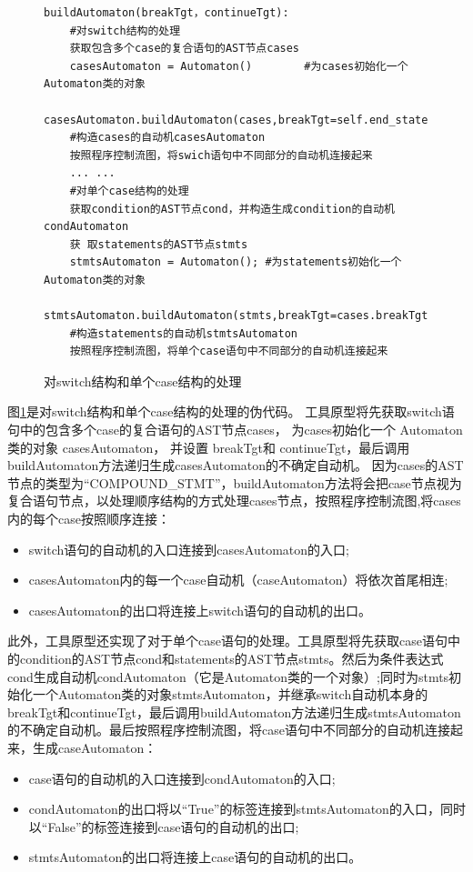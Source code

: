  \begin{figure}[htbp]
	\centering
\begin{minipage}{16cm}
\begin{lstlisting}
buildAutomaton(breakTgt，continueTgt): 
    #对switch结构的处理
    获取包含多个case的复合语句的AST节点cases
    casesAutomaton = Automaton()        #为cases初始化一个Automaton类的对象
    casesAutomaton.buildAutomaton(cases,breakTgt=self.end_state,continueTgt,self.continueTgt)    
    #构造cases的自动机casesAutomaton
    按照程序控制流图，将swich语句中不同部分的自动机连接起来
    ... ...
    #对单个case结构的处理
    获取condition的AST节点cond，并构造生成condition的自动机condAutomaton
    获 取statements的AST节点stmts
    stmtsAutomaton = Automaton(); #为statements初始化一个Automaton类的对象
    stmtsAutomaton.buildAutomaton(stmts,breakTgt=cases.breakTgt,continueTgt=cases.continueTgt)     
    #构造statements的自动机stmtsAutomaton
    按照程序控制流图，将单个case语句中不同部分的自动机连接起来
\end{lstlisting}   
\end{minipage}
    \caption{对switch结构和单个case结构的处理}
    \label{对switch结构和单个case结构的处理}
\end{figure}

图\ref{对switch结构和单个case结构的处理}是对switch结构和单个case结构的处理的伪代码。
工具原型将先获取switch语句中的包含多个case的复合语句的AST节点cases， 为cases初始化一个 Automaton 类的对象 casesAutomaton，
并设置 breakTgt和 continueTgt，最后调用buildAutomaton方法递归生成casesAutomaton的不确定自动机。
因为cases的AST节点的类型为“COMPOUND\_STMT”，buildAutomaton方法将会把case节点视为复合语句节点，以处理顺序结构的方式处理cases节点，按照程序控制流图,将cases内的每个case按照顺序连接：
\begin{itemize}
    \item switch语句的自动机的入口连接到casesAutomaton的入口;
    \item casesAutomaton内的每一个case自动机（caseAutomaton）将依次首尾相连;
    \item casesAutomaton的出口将连接上switch语句的自动机的出口。
\end{itemize}

此外，工具原型还实现了对于单个case语句的处理。工具原型将先获取case语句中的condition的AST节点cond和statements的AST节点stmts。然后为条件表达式cond生成自动机condAutomaton（它是Automaton类的一个对象）;同时为stmts初始化一个Automaton类的对象stmtsAutomaton，并继承switch自动机本身的breakTgt和continueTgt，最后调用buildAutomaton方法递归生成stmtsAutomaton的不确定自动机。最后按照程序控制流图，将case语句中不同部分的自动机连接起来，生成caseAutomaton：
\begin{itemize}
    \item case语句的自动机的入口连接到condAutomaton的入口;
    \item condAutomaton的出口将以“True”的标签连接到stmtsAutomaton的入口，同时以“False”的标签连接到case语句的自动机的出口;
    \item stmtsAutomaton的出口将连接上case语句的自动机的出口。
\end{itemize}



